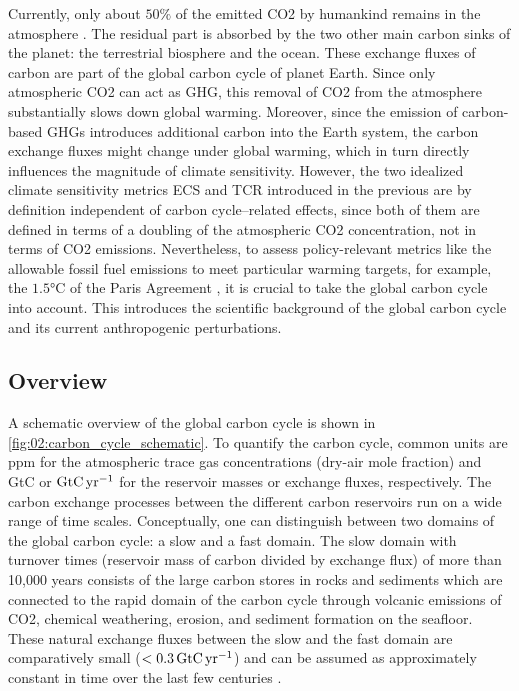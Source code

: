 Currently, only about $50 \unit{\%}$ of the emitted \ac{CO2} by humankind
remains in the atmosphere \autocite{Friedlingstein2020}. The residual part is
absorbed by the two other main carbon sinks of the planet: the terrestrial
biosphere and the ocean. These exchange fluxes of carbon are part of the global
carbon cycle of planet Earth. Since only atmospheric \ac{CO2} can act as
\ac{GHG}, this removal of \ac{CO2} from the atmosphere substantially slows down
global warming. Moreover, since the emission of carbon-based \acp{GHG}
introduces additional carbon into the Earth system, the carbon exchange fluxes
might change under global warming, which in turn directly influences the
magnitude of climate sensitivity. However, the two idealized climate
sensitivity metrics \ac{ECS} and \ac{TCR} introduced in the previous
 are by definition independent of carbon
cycle--related effects, since both of them are defined in terms of a doubling
of the atmospheric \ac{CO2} concentration, not in terms of \ac{CO2} emissions.
Nevertheless, to assess policy-relevant metrics like the allowable fossil fuel
emissions to meet particular warming targets, for example, the $1.5
\unit{\degreeCelsius}$ of the Paris Agreement \autocite{UNFCCC2015}, it is
crucial to take the global carbon cycle into account. This
 introduces the scientific background of the
global carbon cycle and its current anthropogenic perturbations.


\subsection{Overview}
\label{subsec:02:carbon_cycle_overview}

A schematic overview of the global carbon cycle is shown in
\cref{fig:02:carbon_cycle_schematic}. To quantify the carbon cycle, common
units are \ac{ppm} for the atmospheric trace gas concentrations (dry-air mole
fraction) and \ac{GtC} or $\si{\GtCyr{}}$ for the reservoir masses or exchange
fluxes, respectively. The carbon exchange processes between the different
carbon reservoirs run on a wide range of time scales. Conceptually, one can
distinguish between two domains of the global carbon cycle: a slow and a fast
domain. The slow domain with turnover times (reservoir mass of carbon divided
by exchange flux) of more than 10,000 years consists of the large carbon stores
in rocks and sediments which are connected to the rapid domain of the carbon
cycle through volcanic emissions of \ac{CO2}, chemical weathering, erosion, and
sediment formation on the seafloor. These natural exchange fluxes between the
slow and the fast domain are comparatively small ($< 0.3 \unit{\GtCyr{}}$) and
can be assumed as approximately constant in time over the last few centuries
\autocite{Ciais2013}.


